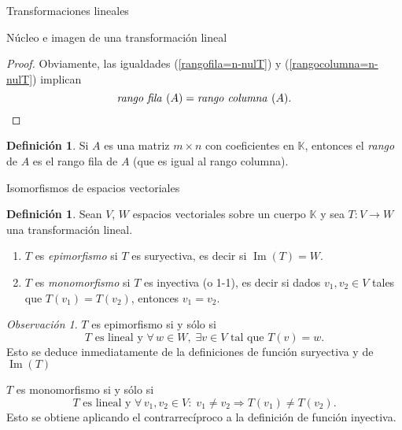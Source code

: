 \documentclass[a4paper,12pt,twoside,spanish,reqno]{amsbook}
\numberwithin{equation}{section}
\theoremstyle{definition}
\newtheorem{definicion}[teorema]{Definici\'on}
\theoremstyle{remark}
\newtheorem*{obs*}{Observaci\'on}
\newcommand{\img}{\operatorname{Im}}
\newcommand{\K}{\mathbb K}
\begin{document}
\begin{chapter}{Transformaciones lineales}
\begin{section}{Núcleo e imagen de una transformación lineal}
\begin{proof}
            Obviamente, las igualdades (\ref{rangofila=n-nulT}) y (\ref{rangocolumna=n-nulT}) implican 
            $$
        \text{\textit{rango fila }} (A) = \text{\textit{rango  columna }} (A).
        $$
        \end{proof}
    
        \begin{definicion}
                Si $A$ es una matriz $m \times n$ con coeficientes  en $\K$,  entonces el \textit{rango} de $A$ es el rango fila de $A$ (que es igual al rango columna).
        \end{definicion}
        
        \end{section}
    
        \begin{section}{Isomorfismos de espacios vectoriales}\label{seccion-isomorfismos-de-ev}
        
        \begin{definicion}
            Sean $V$, $W$ espacios vectoriales sobre un cuerpo $\K$ y sea $T:V \to W$ una transformación lineal.
            \begin{enumerate}
                \item $T$  es \textit{epimorfismo} si $T$ es suryectiva, es decir si $\img(T) = W$.
                \item $T$ es \textit{monomorfismo} si $T$ es inyectiva (o 1-1),  es decir si dados $v_1,v_2 \in V$ tales que $T(v_1) = T(v_2)$,  entonces $v_1 = v_2$.
            \end{enumerate}  
        \end{definicion}
    
        \begin{obs*}
            $T$  es epimorfismo si y sólo si 
            $$
            \text{$T$ es lineal y }\forall\, w \in W, \; \exists v \in V \text{ tal que }T(v)=w.
            $$
            Esto se deduce inmediatamente de la definiciones de función suryectiva y de $\img(T)$
            
            $T$ es monomorfismo si y sólo si 
            $$
                \text{$T$ es lineal y }\forall\, v_1,v_2  \in V: \; v_1 \ne v_2 \Rightarrow T(v_1) \not= T(v_2).
            $$ 
            Esto se obtiene aplicando el contrarrecíproco a la definición de función inyectiva.
        \end{obs*}	
        
        
            

\end{section}
\end{chapter}
\end{document}
